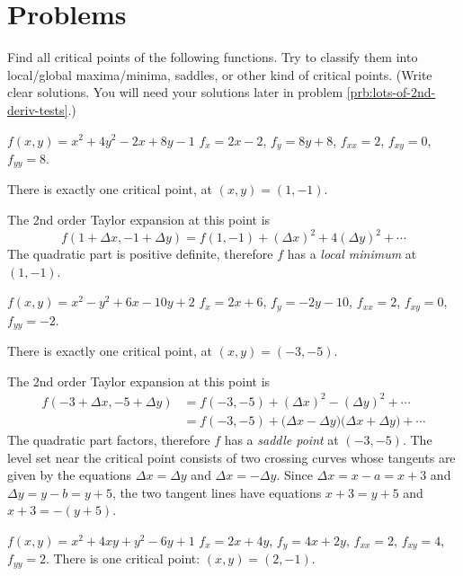 \newpage
\section{Problems}  
\begin{multicols}{2}
\problemfont
\problem\label{prb:find-critical-points}  
Find all critical points of the following functions.  Try to classify
them into local/global maxima/minima, saddles, or other kind of
critical points.  (Write clear solutions.  You will need your
solutions later in problem \ref{prb:lots-of-2nd-deriv-tests}.)

\subprob $f(x,y)=x^2+4y^2-2x+8y-1$
%
\answer 
$f_x = 2x-2$, $f_y = 8y+8$, $f_{xx} = 2$, $f_{xy}=0$, $f_{yy}=8$.

There is exactly one critical point, at $(x, y) = (1,-1)$.

The 2nd order Taylor expansion at this point is 
\[
f(1+\Delta x, -1+\Delta y) = 
f(1, -1) + (\Delta x)^2 + 4(\Delta y)^2 +\cdots
\]
The quadratic part is positive definite, therefore $f$ has a
\emph{local minimum} at $(1, -1)$.
\endanswer

\subprob $f(x,y)=x^2-y^2+6x-10y+2$ 
%
\answer 
$f_x = 2x+6$, $f_y = -2y-10$, $f_{xx} = 2$, $f_{xy}=0$, $f_{yy}=-2$.

There is exactly one critical point, at $(x, y) = (-3,-5)$.

The 2nd order Taylor expansion at this point is 
\begin{align*}
  f(-3+\Delta x, -5+\Delta y)
  &= f(-3, -5) + (\Delta x)^2 - (\Delta y)^2 +\cdots \\
  &= f(-3, -5) +\bigl(\Delta x-\Delta y\bigr)\bigl(\Delta x +\Delta
  y\bigr)+\cdots
\end{align*}
The quadratic part factors, therefore $f$ has a
\emph{saddle point} at $(-3, -5)$.  The level set near the critical
point consists of two crossing curves whose tangents are given by the
equations $\Delta x=\Delta y$ and $\Delta x=-\Delta y$.  Since
$\Delta x=x-a=x+3$ and $\Delta y = y-b = y+5$, the two tangent lines
have equations $x+3 = y+5$ and $x+3 = -(y+5)$.
%

\endanswer

\subprob $f(x,y)=x^2+4xy+y^2-6y+1$ 
\label{prb:find-cpt-01}
\answer 
$f_x = 2x+4y$, $f_y = 4x+2y$, $f_{xx} = 2$, $f_{xy}=4$, $f_{yy}=2$.
There is one critical point: $(x,y) = (2, -1)$.


\end{multicols}
